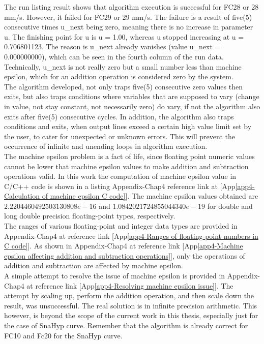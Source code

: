 The run listing result shows that algorithm execution is successful for FC28 or 28 mm/s. However, it failed for FC29 or 29 mm/s. The failure is a result of five(5) consecutive times u\_next being zero, meaning there is no increase in parameter u. The finishing point for u is u = 1.00, whereas u stopped increasing at u = 0.706801123. The reason is u\_next already vanishes (value u\_next = 0.000000000), which can be seen in the fourth column of the run data. Technically, u\_next is not really zero but a small number less than machine epsilon,  which for an addition operation is considered zero by the system. \\

The algorithm developed, not only traps five(5) consecutive zero values then exits, but also traps conditions where variables that are supposed to vary (change in value, not stay constant, not necessarily zero) do vary, if not the algorithm also exits after five(5) consecutive cycles. In addition, the algorithm also traps conditions and exits, when output lines exceed a certain high value limit set by the user, to cater for unexpected or unknown errors. This will prevent the occurrence of infinite and unending loops in algorithm execution. \\

The machine epsilon problem is a fact of life, since floating point numeric values cannot be lower that machine epsilon values to make addition and subtraction operations valid. In this work the computation of machine epsilon value in C/C++ code is shown in a listing Appendix-Chap4 reference link at [App\ref{app4-Calculation of machine epsilon C code}]. The machine epsilon values obtained are $2.2204460492503130808e-16$ and $1.0842021724855044340e-19$ for double and long double precision floating-point types, respectively. \\

The ranges of various floating-point and integer data types are provided in Appendix-Chap4 at reference link [App\ref{app4-Ranges of floating-point numbers in C code}]. As shown in Appendix-Chap4 at reference link [App\ref{app4-Machine epsilon affecting addition and subtraction operations}], only the operations of addition and subtraction are affected by machine epsilon. \\

A simple attempt to resolve the issue of machine epsilon is provided in Appendix-Chap4 at reference link [App\ref{app4-Resolving machine epsilon issue}]. The attempt by scaling up, perform the addition operation, and then scale down the result, was unsuccessful. The real solution is in infinite precision arithmetic. This however, is beyond the scope of the current work in this thesis, especially just for the case of SnaHyp curve. Remember that the algorithm is already correct for FC10 and Fc20 for the SnaHyp curve. \\

